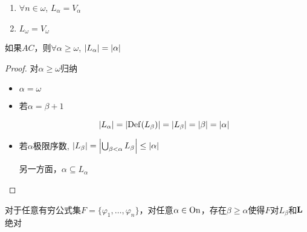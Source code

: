 \documentclass[11pt]{article}
\begin{document}
\begin{lemma}[]
\begin{enumerate}
\item \(\forall n\in\omega\), \(L_\alpha=V_\alpha\)
\item \(L_\omega=V_\omega\)
\end{enumerate}
\end{lemma}

\begin{lemma}[]
如果\(AC\)，则\(\forall\alpha\ge\omega\), \(\abs{L_\alpha}=\abs{\alpha}\)
\end{lemma}

\begin{proof}
对\(\alpha\ge\omega\)归纳

\begin{itemize}
\item \(\alpha=\omega\)
\item 若\(\alpha=\beta+1\)

\begin{equation*}
\abs{L_\alpha}=\abs{\Def(L_\beta)}=\abs{L_\beta}=\abs{\beta}=\abs{\alpha}
\end{equation*}
\item 若\(\alpha\)极限序数, \(\abs{L_\beta}=\abs{\bigcup_{\beta<\alpha}L_\beta}\le\abs{\alpha}\)

另一方面，\(\alpha\subseteq L_\alpha\)
\end{itemize}
\end{proof}

\begin{lemma}[\(\bL\)的反映定理]
对于任意有穷公式集\(F=\{\varphi_1,\dots,\varphi_n\}\)，对任意\(\alpha\in\operatorname{On}\)，存在\(\beta\ge\alpha\)使得\(F\)对\(L_\beta\)和\(\bL\)绝对
\end{lemma}
\end{document}

